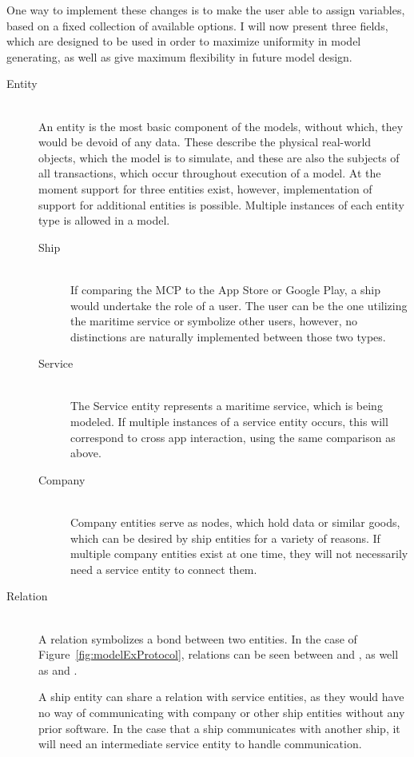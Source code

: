 One way to implement these changes is to make the user able to assign variables, based on a fixed collection of available options. I will now present three fields, which are designed to be used in order to maximize uniformity in model generating, as well as give maximum flexibility in future model design.
\begin{description}
  \item[Entity]\ \\
  An entity is the most basic component of the models, without which, they would be devoid of any data. These describe the physical real-world objects, which the model is to simulate, and these are also the subjects of all transactions, which occur throughout execution of a model. At the moment support for three entities exist, however, implementation of support for additional entities is possible.
  Multiple instances of each entity type is allowed in a model.\newpage
  \begin{description}
    \item[Ship]\ \\
      If comparing the MCP to the App Store or Google Play, a ship would undertake the role of a user. The user can be the one utilizing the maritime service or symbolize other users, however, no distinctions are naturally implemented between those two types.
    \item[Service]\ \\
      The Service entity represents a maritime service, which is being modeled. If multiple instances of a service entity occurs, this will correspond to cross app interaction, using the same comparison as above.
    \item[Company]\ \\
      Company entities serve as nodes, which hold data or similar goods, which can be desired by ship entities for a variety of reasons. If multiple company entities exist at one time, they will not necessarily need a service entity to connect them. 
  \end{description}
  \item[Relation]\ \\
    A relation symbolizes a bond between two entities. In the case of Figure~\ref{fig:modelExProtocol}, relations can be seen between  and , as well as  and .

    A ship entity can share a relation with service entities, as they would have no way of communicating with company or other ship entities without any prior software. In the case that a ship communicates with another ship, it will need an intermediate service entity to handle communication.


\end{description}
